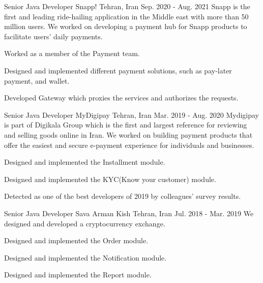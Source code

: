 \begin{cventries}
  \cventry
    {Senior Java Developer} %
    {Snapp!} %
    {Tehran, Iran} %
    {Sep. 2020 - Aug. 2021} %
    {
      Snapp is the first and leading ride-hailing application in the Middle east with more than 50 million users.
      We worked on developing a payment hub for Snapp products to facilitate users' daily payments.
    }
    {
      \begin{cvitems} %
        \item {Worked as a member of the Payment team.}
        \item {Designed and implemented different payment solutions, such as pay-later payment, and wallet.}
        \item {Developed Gateway which proxies the services and authorizes the requests.}
      \end{cvitems}
    }

  \cventry
    {Senior Java Developer} %
    {MyDigipay} %
    {Tehran, Iran} %
    {Mar. 2019 - Aug. 2020} %
    {
      Mydigipay is part of Digikala Group which is the first and largest reference for reviewing and selling goods online in Iran.
      We worked on building payment products that offer the easiest and secure e-payment experience for individuals and businesses.
    }
    {
      \begin{cvitems} %
        \item {Designed and implemented the Installment module.}
        \item {Designed and implemented the KYC(Know your customer) module.}
        \item {Detected as one of the best developers of 2019 by colleagues' survey results.}
      \end{cvitems}
    }

  \cventry
    {Senior Java Developer} %
    {Sava Arman Kish} %
    {Tehran, Iran} %
    {Jul. 2018 - Mar. 2019} %
    {
      We designed and developed a cryptocurrency exchange.
    }
    {
      \begin{cvitems} %
        \item {Designed and implemented the Order module.}
        \item {Designed and implemented the Notification module.}
        \item {Designed and implemented the Report module.}
      \end{cvitems}
    }


\end{cventries}

